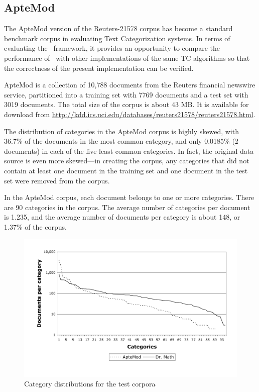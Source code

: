 \subsection{ApteMod}


The ApteMod version of the Reuters-21578 corpus has become a standard
benchmark corpus in evaluating Text Categorization
systems. \cite{yang:99,joachims:98} In terms of evaluating the \aicat\
framework, it provides an opportunity to compare the performance of
\aicat\ with other implementations of the same TC algorithms so that
the correctness of the present implementation can be verified.

ApteMod is a collection of 10,788 documents from the Reuters financial
newswire service, partitioned into a training set with 7769
documents and a test set with 3019 documents.  The total size of the
corpus is about 43 MB.  It is available for download from
\url{http://kdd.ics.uci.edu/databases/reuters21578/reuters21578.html}.

The distribution of categories in the ApteMod corpus is highly skewed,
with 36.7\% of the documents in the most common category, and only
0.0185\% (2 documents) in each of the five least common categories.
In fact, the original data source is even more skewed---in creating
the corpus, any categories that did not contain at least one document
in the training set and one document in the test set were removed from
the corpus. \cite{yang:99}

In the ApteMod corpus, each document belongs to one or more
categories.  There are 90 categories in the corpus.  The average
number of categories per document is 1.235, and the average number of
documents per category is about 148, or 1.37\% of the corpus.

\begin{figure}
\begin{center}
\includegraphics[width=\linewidth]{figures/Corpora-catdist.pdf}
\caption{Category distributions for the test corpora}
\label{Corpora-catdist}
\end{center}
\end{figure}

